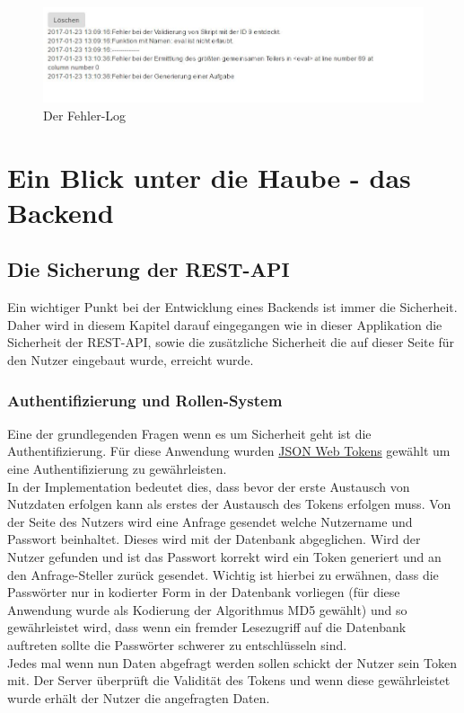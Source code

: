 \begin{enumerate}
\begin{figure}[htp]     %
\centering
\includegraphics[width=1\textwidth]{bilder/ErrorLog} 
\caption[Der Fehler-Log]{Der Fehler-Log}
\end{figure} 




\chapter{Ein Blick unter die Haube - das Backend}

\section{Die Sicherung der REST-API}

Ein wichtiger Punkt bei der Entwicklung eines Backends ist immer die Sicherheit. Daher wird in diesem Kapitel darauf eingegangen wie in dieser Applikation die Sicherheit der REST-API, sowie die zusätzliche Sicherheit die auf dieser Seite für den Nutzer eingebaut wurde, erreicht wurde. \\


\subsection{Authentifizierung und Rollen-System}

Eine der grundlegenden Fragen wenn es um Sicherheit geht ist die Authentifizierung. Für diese Anwendung wurden \hyperref[JWT]{JSON Web Tokens} gewählt um eine Authentifizierung zu gewährleisten. \\
In der Implementation bedeutet dies, dass bevor der erste Austausch von Nutzdaten erfolgen kann als erstes der Austausch des Tokens erfolgen muss. Von der Seite des Nutzers wird eine Anfrage gesendet welche Nutzername und Passwort beinhaltet. Dieses wird mit der Datenbank abgeglichen. Wird der Nutzer gefunden und ist das Passwort korrekt wird ein Token generiert und an den Anfrage-Steller zurück gesendet. Wichtig ist hierbei zu erwähnen, dass die Passwörter nur in kodierter Form in der Datenbank vorliegen (für diese Anwendung wurde als Kodierung der Algorithmus MD5 gewählt) und so gewährleistet wird, dass wenn ein fremder Lesezugriff auf die Datenbank auftreten sollte die Passwörter schwerer zu entschlüsseln sind. \\
Jedes mal wenn nun Daten abgefragt werden sollen schickt der Nutzer sein Token mit. Der Server überprüft die Validität des Tokens und wenn diese gewährleistet wurde erhält der Nutzer die angefragten Daten. \\


\end{enumerate}
